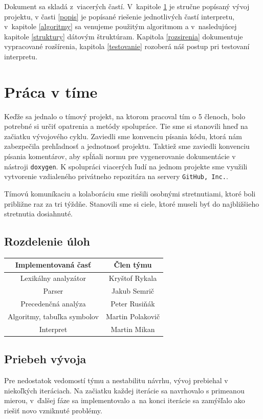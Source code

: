 \documentclass[11pt,a4paper]{article}
\begin{document}
Dokument sa skladá z~viacerých častí. V~kapitole \ref{tim} je stručne popísaný vývoj projektu, v časti \ref{popis} je popísané riešenie jednotlivých častí interpretu, v~kapitole \ref{algoritmy} sa venujeme použitým algoritmom a v~nasledujúcej kapitole \ref{struktury} dátovým štruktúram. Kapitola \ref{rozsirenia} dokumentuje vypracované rozšírenia, kapitola \ref{testovanie} rozoberá náš postup pri testovaní interpretu.


\section{Práca v tíme}
\label{tim}

Keďže sa jednalo o tímový projekt, na ktorom pracoval tím o 5 členoch, bolo potrebné si určiť opatrenia a metódy spolupráce. Tie sme si stanovili hneď na začiatku vývojového cyklu. Zaviedli sme konvenciu písania kódu, ktorá nám zabezpečila prehľadnosť a jednotnosť projektu. Taktiež sme zaviedli konvenciu písania komentárov, aby spĺňali normu pre vygenerovanie dokumentácie v nástroji \texttt{doxygen}. K spolupráci viacerých ľudí na jednom projekte sme využili vytvorenie vzdialeného privátneho repozitára na servery \texttt{GitHub, Inc.}.

Tímovú komuníkaciu a kolaboráciu sme riešili osobnými stretnutiami, ktoré boli približne raz za tri týždňe. Stanovili sme si ciele, ktoré museli byť do najbližšieho stretnutia dosiahnuté.

    \subsection{Rozdelenie úloh}
    \begin{center}
    \begin{tabular}{|c|c|}
    \hline
    \large{\textbf{Implementovaná časť}} & \large{\textbf{Člen týmu}}\\
    \hline
    \hline
    Lexikálny analyzátor & Kryštof Rykala \\
    \hline
    Parser & Jakub Semrič \\
    \hline
    Precedenčná analýza & Peter Rusiňák \\
    \hline
    Algoritmy, tabuľka symbolov & Martin Polakovič \\
    \hline
    Interpret & Martin Mikan \\
    \hline
    \end{tabular}
\end{center}

    \subsection{Priebeh vývoja}
    \label{vyvoj}
    Pre nedostatok vedomostí týmu a nestabilitu návrhu, vývoj prebiehal v niekoľkých
    iteráciach. Na začiatku každej iterácie sa navrhovalo s primeanou mierou,
    v~ďalšej fáze sa implementovalo a~na konci iterácie sa zamýšľalo ako riešiť
    novo vzniknuté problémy.
\end{document}
